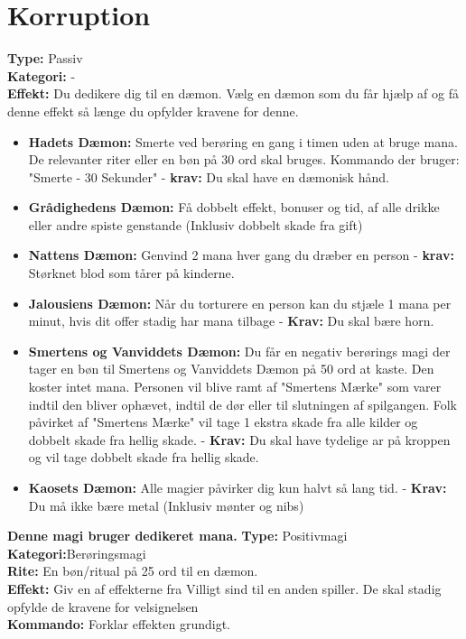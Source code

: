 \section{Korruption}
\begin{korruption*}
\textbf{Type:} Passiv\\
\textbf{Kategori:} -\\
    \textbf{Effekt:} Du dedikere dig til en dæmon. Vælg en dæmon som du får hjælp af og få denne effekt så længe du opfylder kravene for denne.
        \begin{itemize}
            \item \textbf{Hadets Dæmon:} Smerte ved berøring en gang i timen uden at bruge mana. De relevanter riter eller en bøn på 30 ord skal bruges. Kommando der bruger: "Smerte - 30 Sekunder" - \textbf{krav:} Du skal have en dæmonisk hånd.
            \item \textbf{Grådighedens Dæmon:} Få dobbelt effekt, bonuser og tid, af alle drikke eller andre spiste genstande (Inklusiv dobbelt skade fra gift)
            \item \textbf{Nattens Dæmon:} Genvind 2 mana hver gang du dræber en person - \textbf{krav:} Størknet blod som tårer på kinderne.
            \item \textbf{Jalousiens Dæmon:} Når du torturere en person kan du stjæle 1 mana per minut, hvis dit offer stadig har mana tilbage - \textbf{Krav:} Du skal bære horn.
            \item \textbf{Smertens og Vanviddets Dæmon:} Du får en negativ berørings magi der tager en bøn til Smertens og Vanviddets Dæmon på 50 ord at kaste. Den koster intet mana. Personen vil blive ramt af "Smertens Mærke" som varer indtil den bliver ophævet, indtil de dør eller til slutningen af spilgangen. Folk påvirket af "Smertens Mærke" vil tage 1 ekstra skade fra alle kilder og dobbelt skade fra hellig skade. - \textbf{Krav:} Du skal have tydelige ar på kroppen og vil tage dobbelt skade fra hellig skade.
            \item \textbf{Kaosets Dæmon:} Alle magier påvirker dig kun halvt så lang tid. - \textbf{Krav:} Du må ikke bære metal (Inklusiv mønter og nibs)
        \end{itemize}
    \end{korruption*}

\begin{korruption*}
\textbf{Denne magi bruger dedikeret mana.}
\textbf{Type:} Positivmagi\\
\textbf{Kategori:}Berøringsmagi\\
\textbf{Rite:} En bøn/ritual på 25 ord til en dæmon.\\
\textbf{Effekt:} Giv en af effekterne fra Villigt sind til en anden spiller. De skal stadig opfylde de kravene for velsignelsen\\
\textbf{Kommando:} Forklar effekten grundigt.
\end{korruption*}

